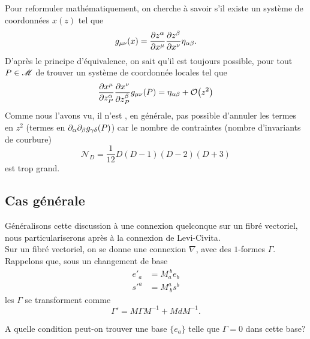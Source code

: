 \documentclass[a4paper,11pt]{report}
\begin{document}
            Pour reformuler mathématiquement, on cherche à savoir s'il existe un système de coordonnées $x(z)$ tel que
            \begin{equation}
                g_{\mu\nu}(x) = \pdv{z^\alpha}{x^\mu}\pdv{z^\beta}{x^\nu}\eta_{\alpha\beta}.
            \end{equation}
            D'après le principe d'équivalence, on sait qu'il est toujours possible, pour tout $P\in\mathscr{M}$ de trouver un système de coordonnée locales tel que
            \begin{equation}
                \pdv{x^\mu}{z^\alpha_P}\pdv{x^\nu}{z^\beta_P}g_{\mu\nu}(P) = \eta_{\alpha\beta} + \order{z^2}
            \end{equation}
            Comme nous l'avons vu, il n'est , en générale, pas possible d'annuler les termes en $z^2$ (termes en $\partial_\alpha\partial_\beta g_{\gamma\delta}(P)$) car le nombre de contraintes (nombre d'invariants de courbure)
            \begin{equation}
                \mathscr{N}_D = \frac{1}{12}D(D-1)(D-2)(D+3)
            \end{equation}
            est trop grand.
            
            \subsection{Cas générale}
            
                Généralisons cette discussion à une connexion quelconque sur un fibré vectoriel, nous particulariserons après à la connexion de Levi-Civita.\\
                
                Sur un fibré vectoriel, on se donne une connexion $\nabla$, avec des $1$-formes $\Gamma$. Rappelons que, sous un changement de base
                \begin{align}
                    e'_a &= M_a^{~b}e_b \\
                    s'^a &= M^a_{~b}s^b
                \end{align}
                les $\Gamma$ se transforment comme
                \begin{equation}
                    \Gamma' = M\Gamma M^{-1} + MdM^{-1}.
                \end{equation}
                
                A quelle condition peut-on trouver une base $\{e_a\}$ telle que $\Gamma = 0$ dans cette base?
                
\end{document}
